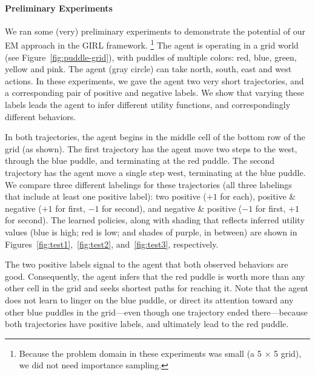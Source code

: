 
\vspace{\up}
\paragraph{Preliminary Experiments}

We ran some (very) preliminary experiments to demonstrate the
potential of our EM approach in the GIRL framework.%
\footnote{Because the problem domain in these experiments
was small (a 5 $\times$ 5 grid), we did not need importance sampling.}
%
The agent is operating in a grid world (see
Figure~\ref{fig:puddle-grid}), with puddles of multiple colors: red,
blue, green, yellow and pink.  The agent (gray circle) can take north, south, east
and west actions.
In these experiments, we gave the agent two very short
trajectories, and a corresponding pair of positive and negative
labels.  We show that varying these labels leads the agent to
infer different utility functions, and correspondingly different
behaviors.

In both trajectories, the agent begins in the middle cell of the
bottom row of the grid (as shown).  The first trajectory has the agent
move two steps to the west, through the blue puddle, and terminating
at the red puddle.  The second trajectory has the agent move a single
step west, terminating at the blue puddle.
%
%
We compare three different labelings for these trajectories (all three
labelings that include at least one positive label): two positive
($+1$ for each), positive \& negative ($+1$ for first, $-1$ for
second), and negative \& positive ($-1$ for first, $+1$ for
second). The learned policies, along with shading that reflects
inferred utility values (blue is high; red is low; and shades of
purple, in between)
are shown in Figures~\ref{fig:test1},~\ref{fig:test2},
and~\ref{fig:test3}, respectively.

The two positive labels signal to the agent that both observed
behaviors are good.  Consequently, the agent infers that the red
puddle is worth more than any other cell in the grid and seeks
shortest paths for reaching it.  Note that the agent does not learn to
linger on the blue puddle, or direct its attention toward any other
blue puddles in the grid---even though one trajectory ended
there---because both trajectories have positive labels, and ultimately
lead to the red puddle.

